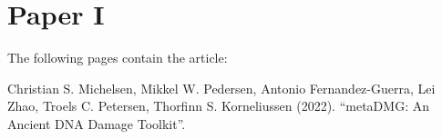 \chapter{Paper I}
\label{chapter:metadmg}

The following pages contain the article:
\vspace*{1cm}


Christian S. Michelsen, Mikkel W. Pedersen, Antonio Fernandez-Guerra, Lei Zhao, Troels C. Petersen, Thorfinn S. Korneliussen (2022). ``metaDMG: An Ancient DNA Damage Toolkit''.

% 



